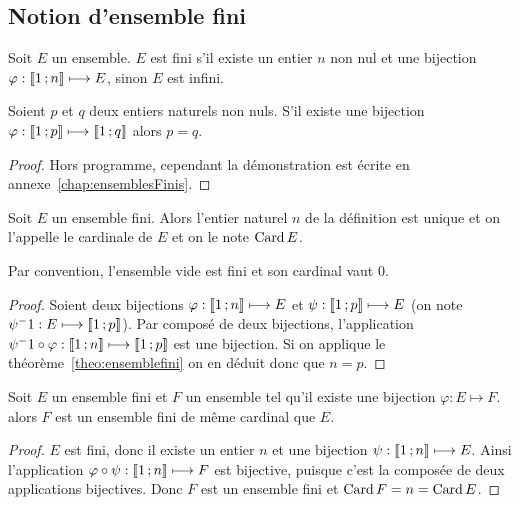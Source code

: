 \subsection{Notion d'ensemble fini}

\begin{defdef}
  Soit \(E\) un ensemble. \(E\) est fini s'il existe un entier \(n\) non nul et une bijection \(\varphi:\mathopen{\llbracket}1\mathclose{}\mathpunct{};n\mathclose{\rrbracket} \longmapsto E\), sinon \(E\) est infini.
\end{defdef}
\begin{theo}\label{theo:ensemblefini}
  Soient \(p\) et \(q\) deux entiers naturels non nuls. S'il existe une bijection \(\varphi:\mathopen{\llbracket}1\mathclose{}\mathpunct{};p\mathclose{\rrbracket} \longmapsto \mathopen{\llbracket}1\mathclose{}\mathpunct{};q\mathclose{\rrbracket}\) alors \(p=q\).
\end{theo}
\begin{proof}
  Hors programme, cependant la démonstration est écrite en annexe~\ref{chap:ensemblesFinis}.
\end{proof}
\begin{prop}[Définition]
  Soit \(E\) un ensemble fini. Alors l'entier naturel \(n\) de la définition est unique et on l'appelle le cardinale de \(E\) et on le note \(\operatorname{Card} E\).
\end{prop}
Par convention, l'ensemble vide est fini et son cardinal vaut \(0\).
\begin{proof}
  Soient deux bijections \(\varphi:\mathopen{\llbracket}1\mathclose{}\mathpunct{};n\mathclose{\rrbracket} \longmapsto E\) et \(\psi:\mathopen{\llbracket}1\mathclose{}\mathpunct{};p\mathclose{\rrbracket} \longmapsto E\) (on note \(\psi^-1:E \longmapsto \mathopen{\llbracket}1\mathclose{}\mathpunct{};p\mathclose{\rrbracket}\)). Par composé de deux bijections, l'application \(\psi^-1\circ \varphi: \mathopen{\llbracket}1\mathclose{}\mathpunct{};n\mathclose{\rrbracket} \longmapsto \mathopen{\llbracket}1\mathclose{}\mathpunct{};p\mathclose{\rrbracket}\) est une bijection. Si on applique le théorème~\ref{theo:ensemblefini} on en déduit donc que \(n=p\).
\end{proof}
\begin{prop}
  Soit \(E\) un ensemble fini et \(F\) un ensemble tel qu'il existe une bijection \(\varphi:E\longmapsto F\). alors \(F\) est un ensemble fini de même cardinal que \(E\).
\end{prop}
\begin{proof}
  \(E\) est fini, donc il existe un entier \(n\) et une bijection \(\psi:\mathopen{\llbracket}1\mathclose{}\mathpunct{};n\mathclose{\rrbracket} \longmapsto E\). Ainsi l'application \(\varphi\circ\psi:\mathopen{\llbracket}1\mathclose{}\mathpunct{};n\mathclose{\rrbracket} \longmapsto F\) est bijective, puisque c'est la composée de deux applications bijectives. Donc \(F\) est un ensemble fini et \(\operatorname{Card} F=n=\operatorname{Card} E\).
\end{proof}

